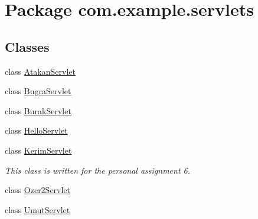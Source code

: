 \hypertarget{namespacecom_1_1example_1_1servlets}{}\section{Package com.\+example.\+servlets}
\label{namespacecom_1_1example_1_1servlets}
\subsection*{Classes}
\begin{DoxyCompactItemize}
\item 
class \hyperlink{classcom_1_1example_1_1servlets_1_1_atakan_servlet}{Atakan\+Servlet}
\item 
class \hyperlink{classcom_1_1example_1_1servlets_1_1_bugra_servlet}{Bugra\+Servlet}
\item 
class \hyperlink{classcom_1_1example_1_1servlets_1_1_burak_servlet}{Burak\+Servlet}
\item 
class \hyperlink{classcom_1_1example_1_1servlets_1_1_hello_servlet}{Hello\+Servlet}
\item 
class \hyperlink{classcom_1_1example_1_1servlets_1_1_kerim_servlet}{Kerim\+Servlet}
\begin{DoxyCompactList}\small\item\em This class is written for the personal assignment 6. \end{DoxyCompactList}\item 
class \hyperlink{classcom_1_1example_1_1servlets_1_1_ozer2_servlet}{Ozer2\+Servlet}
\item 
class \hyperlink{classcom_1_1example_1_1servlets_1_1_umut_servlet}{Umut\+Servlet}
\end{DoxyCompactItemize}
